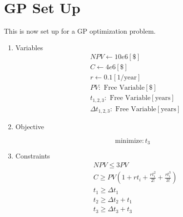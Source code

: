 \documentclass[10pt, a4paper]{article}
\begin{document}
\section*{GP Set Up}

This is now set up for a GP optimization problem. 

\begin{enumerate}

\item Variables
\[ \begin{array}{ll}
 & NPV \gets 10e6 [\$] \\
 & C \gets 4e6 [\$] \\
 & r \gets 0.1 [1/\text{year}] \\
 & PV: \text{ Free Variable} [\$] \\
 & t_{1,2,3}: \text{ Free Variable} [\text{years}] \\
 & \Delta t_{1,2,3}: \text{ Free Variable} [\text{years}] 
 \end{array} \]
 
 \item Objective 
 
 \[ \text{minimize}: t_3 \]
 
 \item Constraints
 \[ \begin{array}{ll}
 & NPV \leq 3PV \\
 & C \geq PV\left(1 + rt_i + \frac{rt_i^2}{2!} + \frac{rt_i^3}{3!} \right) \\
 & t_1 \geq \Delta t_1 \\
 & t_2 \geq \Delta t_2 + t_1 \\
 & t_3 \geq \Delta t_3 + t_3 \\
 \end{array} \]



\end{enumerate}
\end{document}

